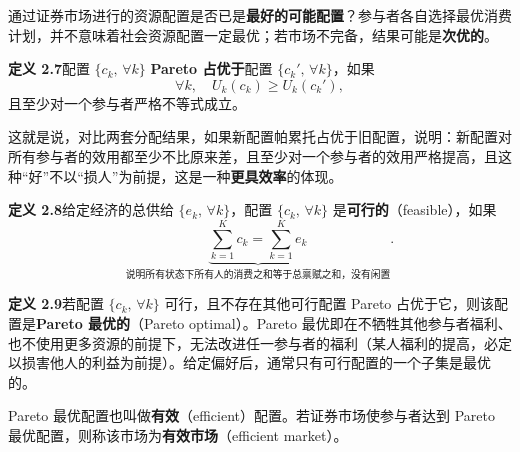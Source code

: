 \begin{tcolorbox}[knowledge,title=2.6 最优性]
通过证券市场进行的资源配置是否已是\textbf{最好的可能配置}？参与者各自选择最优消费计划，并不意味着社会资源配置一定最优；若市场不完备，结果可能是\textbf{次优的}。

\begin{tcolorbox}[knowledge]
\textbf{定义 2.7}\quad 配置 $\{c_k,\,\forall k\}$ \textbf{Pareto 占优于}配置 $\{c_k',\,\forall k\}$，如果
\[
    \forall k,\quad U_k(c_k)\ge U_k(c_k'),
\]
且至少对一个参与者严格不等式成立。

这就是说，对比两套分配结果，如果新配置帕累托占优于旧配置，说明：新配置对所有参与者的效用都至少不比原来差，且至少对一个参与者的效用严格提高，且这种“好”不以“损人”为前提，这是一种\textbf{更具效率}的体现。
\end{tcolorbox}



\begin{tcolorbox}[knowledge]
\textbf{定义 2.8}\quad 给定经济的总供给 $\{e_k,\,\forall k\}$，配置 $\{c_k,\,\forall k\}$ 是\textbf{可行的}（feasible），如果
\[
    \underbrace{\sum_{k=1}^{K}c_k=\sum_{k=1}^{K}e_k}_{\text{说明所有状态下所有人的消费之和等于总禀赋之和，没有闲置}}.
\]
\end{tcolorbox}

\begin{tcolorbox}[knowledge]
\textbf{定义 2.9}\quad 若配置 $\{c_k,\,\forall k\}$ 可行，且不存在其他可行配置 Pareto 占优于它，则该配置是\textbf{Pareto 最优的}（Pareto optimal）。Pareto 最优即在不牺牲其他参与者福利、也不使用更多资源的前提下，无法改进任一参与者的福利（某人福利的提高，必定以损害他人的利益为前提）。给定偏好后，通常只有可行配置的一个子集是最优的。
\end{tcolorbox}

Pareto 最优配置也叫做\textbf{有效}（efficient）配置。若证券市场使参与者达到 Pareto 最优配置，则称该市场为\textbf{有效市场}（efficient market）。
\end{tcolorbox}


